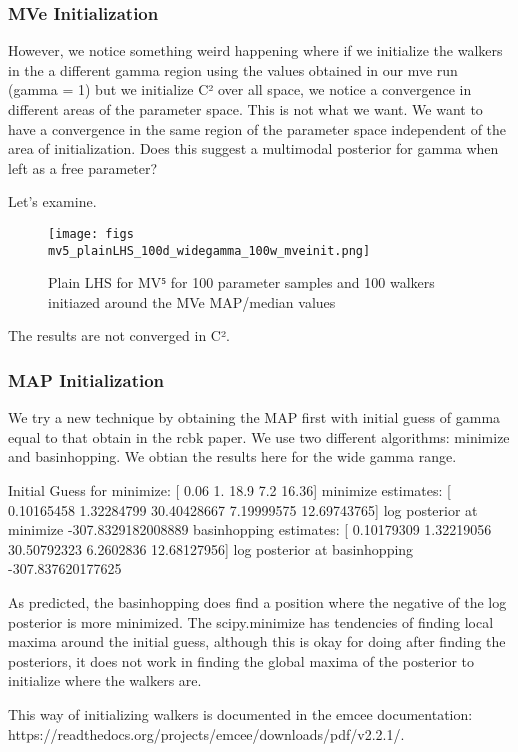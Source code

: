 \documentclass{article}
\begin{document}
\subsubsection{MVe Initialization}

However, we notice something weird happening where if we initialize the walkers in the a different gamma region using the values obtained in our mve run (gamma = 1) but we initialize C² over all space, we notice a convergence in different areas of the parameter space. This is not what we want. We want to have a convergence in the same region of the parameter space independent of the area of initialization. Does this suggest a multimodal posterior for gamma when left as a free parameter?

Let's examine.

\begin{figure}
\centering
\texttt{[image: figs\\mv5\_plainLHS\_100d\_widegamma\_100w\_mveinit.png]}
\caption{Plain LHS for MV⁵ for 100 parameter samples and 100 walkers initiazed around the MVe MAP/median values}
\label{fig:mv5_plainLHS_100d_widegamma_100w_mveinit}
\end{figure}

The results are not converged in C².


\subsubsection{MAP Initialization}
We try a new technique by obtaining the MAP first with initial guess of gamma equal to that obtain in the rcbk paper. We use two different algorithms: minimize and basinhopping. We obtian the results here for the wide gamma range.

Initial Guess for minimize:  [ 0.06  1.   18.9   7.2  16.36]
minimize estimates:  [ 0.10165458  1.32284799 30.40428667  7.19999575 12.69743765]
log posterior at minimize -307.8329182008889
basinhopping estimates:  [ 0.10179309  1.32219056 30.50792323  6.2602836  12.68127956]
log posterior at basinhopping -307.837620177625

As predicted, the basinhopping does find a position where the negative of the log posterior is more minimized. The scipy.minimize has tendencies of finding local maxima around the initial guess, although this is okay for doing after finding the posteriors, it does not work in finding the global maxima of the posterior to initialize where the walkers are. 

This way of initializing walkers is documented in the emcee documentation: https://readthedocs.org/projects/emcee/downloads/pdf/v2.2.1/.
\end{document}
